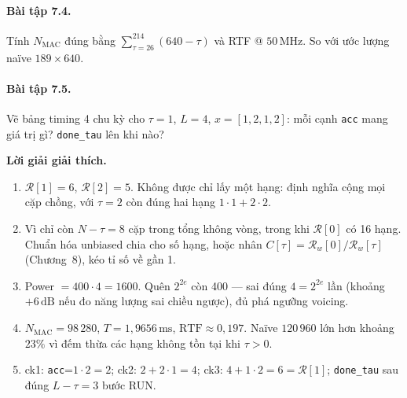 \paragraph{Bài tập 7.4.} Tính $N_{\mathrm{MAC}}$ đúng bằng $\sum_{\tau=26}^{214}(640-\tau)$ và RTF @ $50\,\text{MHz}$. So với ước lượng naïve $189\times 640$.

\paragraph{Bài tập 7.5.} Vẽ bảng timing 4 chu kỳ cho $\tau=1$, $L=4$, $x=[1,2,1,2]$: mỗi cạnh \texttt{acc} mang giá trị gì? \texttt{done\_tau} lên khi nào?

\noindent\textbf{Lời giải giải thích.}
\begin{enumerate}[leftmargin=1.4em]
\item $\mathcal{R}[1] = 6$, $\mathcal{R}[2] = 5$. Không được chỉ lấy một hạng: định nghĩa cộng mọi cặp chồng, với $\tau=2$ còn đúng hai hạng $1\cdot 1 + 2\cdot 2$.
\item Vì chỉ còn $N-\tau = 8$ cặp trong tổng không vòng, trong khi $\mathcal{R}[0]$ có 16 hạng. Chuẩn hóa unbiased chia cho số hạng, hoặc nhân $C[\tau] = \mathcal{R}_w[0]/\mathcal{R}_w[\tau]$ (Chương~8), kéo tỉ số về gần 1.
\item Power $= 400\cdot 4 = 1600$. Quên $2^{2e}$ còn 400 --- sai đúng $4 = 2^{2e}$ lần (khoảng $+6\,\text{dB}$ nếu đo năng lượng sai chiều ngược), đủ phá ngưỡng voicing.
\item $N_{\mathrm{MAC}} = 98\,280$, $T = 1{,}9656\,\text{ms}$, $\mathrm{RTF} \approx 0{,}197$. Naïve $120\,960$ lớn hơn khoảng $23\%$ vì đếm thừa các hạng không tồn tại khi $\tau>0$.
\item ck1: \texttt{acc}=$1\cdot 2=2$; ck2: $2+2\cdot 1=4$; ck3: $4+1\cdot 2=6=\mathcal{R}[1]$; \texttt{done\_tau} sau đúng $L-\tau=3$ bước RUN.
\end{enumerate}
